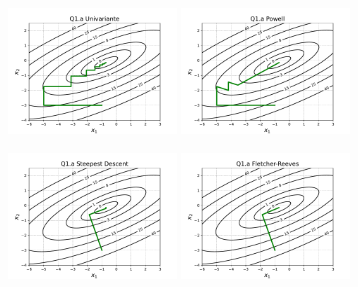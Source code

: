 \documentclass[10pt, a4paper]{article}
\begin{document}
\begin{figure}[H]
  \centering
  \begin{subfigure}[b]{\textwidth}
    \includegraphics[width=0.49\textwidth]{figuras/Q1.a_Univariante_P0=[-1 -3].pdf}
    \includegraphics[width=0.49\textwidth]{figuras/Q1.a_Powell_P0=[-1 -3].pdf}
  \end{subfigure}
  \begin{subfigure}[b]{\textwidth}
    \includegraphics[width=0.49\textwidth]{figuras/Q1.a_Steepest Descent_P0=[-1 -3].pdf}
    \includegraphics[width=0.49\textwidth]{figuras/Q1.a_Fletcher-Reeves_P0=[-1 -3].pdf}

\end{subfigure}
\end{figure}
\end{document}
